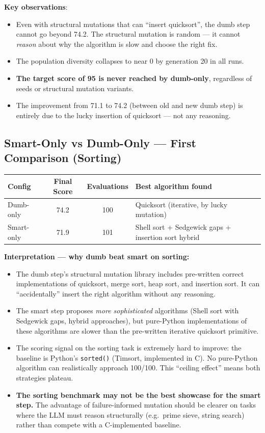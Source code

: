 \documentclass[11pt,a4paper]{article}
\begin{document}
\textbf{Key observations}:
\begin{itemize}
  \item Even with structural mutations that can ``insert quicksort'', the dumb
    step cannot go beyond 74.2. The structural mutation is random — it cannot
    \emph{reason} about why the algorithm is slow and choose the right fix.
  \item The population diversity collapses to near 0 by generation 20 in all runs.
  \item \textbf{The target score of 95 is never reached by dumb-only},
    regardless of seeds or structural mutation variants.
  \item The improvement from 71.1 to 74.2 (between old and new dumb step) is
    entirely due to the lucky insertion of quicksort — not any reasoning.
\end{itemize}

\subsection{Smart-Only vs Dumb-Only — First Comparison (Sorting)}

\begin{center}
\begin{tabular}{lccl}
\toprule
\textbf{Config} & \textbf{Final Score} & \textbf{Evaluations} & \textbf{Best algorithm found} \\
\midrule
Dumb-only & 74.2 & 100 & Quicksort (iterative, by lucky mutation) \\
Smart-only & 71.9 & 101 & Shell sort + Sedgewick gaps + insertion sort hybrid \\
\bottomrule
\end{tabular}
\end{center}

\textbf{Interpretation — why dumb beat smart on sorting:}
\begin{itemize}
  \item The dumb step's structural mutation library includes pre-written correct
    implementations of quicksort, merge sort, heap sort, and insertion sort.
    It can ``accidentally'' insert the right algorithm without any reasoning.
  \item The smart step proposes \emph{more sophisticated} algorithms (Shell sort
    with Sedgewick gaps, hybrid approaches), but pure-Python implementations of
    these algorithms are slower than the pre-written iterative quicksort primitive.
  \item The scoring signal on the sorting task is extremely hard to improve:
    the baseline is Python's \texttt{sorted()} (Timsort, implemented in C).
    No pure-Python algorithm can realistically approach 100/100.
    This ``ceiling effect'' means both strategies plateau.
  \item \textbf{The sorting benchmark may not be the best showcase for the smart
    step.} The advantage of failure-informed mutation should be clearer on tasks
    where the LLM must reason structurally (e.g.\ prime sieve, string search)
    rather than compete with a C-implemented baseline.
\end{itemize}
\end{document}
